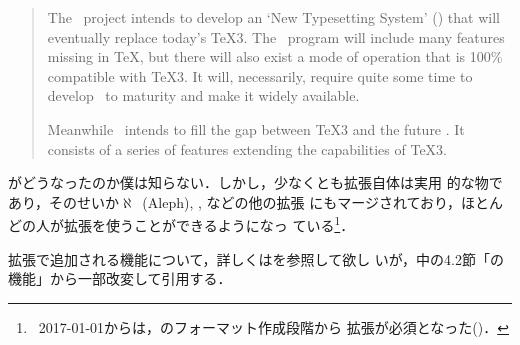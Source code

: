 \documentclass[a4paper,11pt,nomag,dvipdfmx]{jsarticle}
\begin{document}
\begin{quotation}
The \NTS\ project intends to develop an `New Typesetting System' (\NTS)
that will eventually replace today's \TeX3.  The \NTS\ program will
include many features missing in \TeX, but there will also exist a mode
of operation that is 100\% compatible with \TeX3.  It will, necessarily,
require quite some time to develop \NTS\ to maturity and make it widely
available.

Meanwhile \eTeX\ intends to fill the gap between \TeX3 and the future
\NTS. It consists of a series of features extending the capabilities of
\TeX3.
\end{quotation}

\NTS がどうなったのか僕は知らない．しかし，少なくとも\eTeX 拡張自体は実用
的な物であり，そのせいか$\aleph$~(Aleph), , などの他の拡張
にもマージされており，ほとんどの人が\eTeX 拡張を使うことができるようになっ
ている\footnote{\LaTeXe~2017-01-01からは，\LaTeXe のフォーマット作成段階から
\eTeX 拡張が必須となった(\cite{l2e26})．}．

\eTeX 拡張で追加される機能について，詳しくは\cite{etexman}を参照して欲し
いが，\cite{h7k}中の4.2節「\eTeX の機能」から一部改変して引用する．
\end{document}
